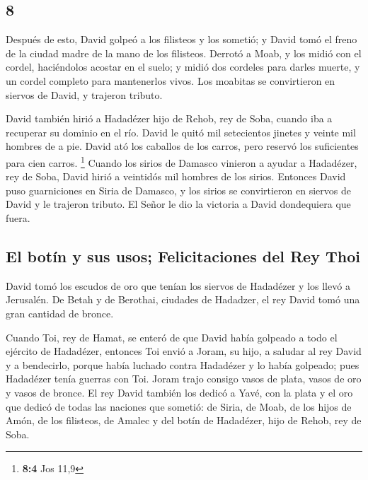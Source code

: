 \begin{paracol}{2}
\hypertarget{section-14}{%
\section{8}\label{section-14}}

 Después de esto, David golpeó a los filisteos y los
sometió; y David tomó el freno de la ciudad madre de la mano de los
filisteos.  Derrotó a Moab, y los midió con el cordel,
haciéndolos acostar en el suelo; y midió dos cordeles para darles
muerte, y un cordel completo para mantenerlos vivos. Los moabitas se
convirtieron en siervos de David, y trajeron tributo.

 David también hirió a Hadadézer hijo de Rehob, rey de
Soba, cuando iba a recuperar su dominio en el río.  David
le quitó mil setecientos jinetes y veinte mil hombres de a pie. David
ató los caballos de los carros, pero reservó los suficientes para cien
carros. \footnote{\textbf{8:4} Jos 11,9}  Cuando los
sirios de Damasco vinieron a ayudar a Hadadézer, rey de Soba, David
hirió a veintidós mil hombres de los sirios.  Entonces
David puso guarniciones en Siria de Damasco, y los sirios se
convirtieron en siervos de David y le trajeron tributo. El Señor le dio
la victoria a David dondequiera que fuera.

\hypertarget{el-botuxedn-y-sus-usos-felicitaciones-del-rey-thoi}{%
\subsection{El botín y sus usos; Felicitaciones del Rey
Thoi}\label{el-botuxedn-y-sus-usos-felicitaciones-del-rey-thoi}}

 David tomó los escudos de oro que tenían los siervos de
Hadadézer y los llevó a Jerusalén.  De Betah y de
Berothai, ciudades de Hadadzer, el rey David tomó una gran cantidad de
bronce.

 Cuando Toi, rey de Hamat, se enteró de que David había
golpeado a todo el ejército de Hadadézer,  entonces Toi
envió a Joram, su hijo, a saludar al rey David y a bendecirlo, porque
había luchado contra Hadadézer y lo había golpeado; pues Hadadézer tenía
guerras con Toi. Joram trajo consigo vasos de plata, vasos de oro y
vasos de bronce.  El rey David también los dedicó a Yavé,
con la plata y el oro que dedicó de todas las naciones que sometió:
 de Siria, de Moab, de los hijos de Amón, de los
filisteos, de Amalec y del botín de Hadadézer, hijo de Rehob, rey de
Soba.


\end{paracol}
